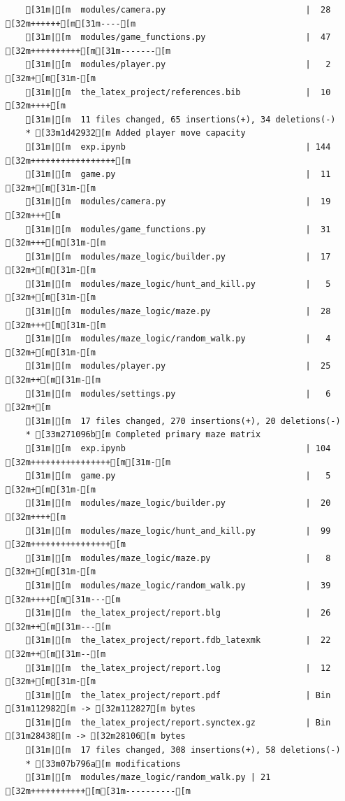 \documentclass{article}
\begin{document}
{\begin{verbatim}
    [31m|[m  modules/camera.py                            |  28 [32m++++++[m[31m----[m
    [31m|[m  modules/game_functions.py                    |  47 [32m++++++++++[m[31m-------[m
    [31m|[m  modules/player.py                            |   2 [32m+[m[31m-[m
    [31m|[m  the_latex_project/references.bib             |  10 [32m++++[m
    [31m|[m  11 files changed, 65 insertions(+), 34 deletions(-)
    * [33m1d42932[m Added player move capacity
    [31m|[m  exp.ipynb                                    | 144 [32m+++++++++++++++++[m
    [31m|[m  game.py                                      |  11 [32m+[m[31m-[m
    [31m|[m  modules/camera.py                            |  19 [32m+++[m
    [31m|[m  modules/game_functions.py                    |  31 [32m+++[m[31m-[m
    [31m|[m  modules/maze_logic/builder.py                |  17 [32m+[m[31m-[m
    [31m|[m  modules/maze_logic/hunt_and_kill.py          |   5 [32m+[m[31m-[m
    [31m|[m  modules/maze_logic/maze.py                   |  28 [32m+++[m[31m-[m
    [31m|[m  modules/maze_logic/random_walk.py            |   4 [32m+[m[31m-[m
    [31m|[m  modules/player.py                            |  25 [32m++[m[31m-[m
    [31m|[m  modules/settings.py                          |   6 [32m+[m
    [31m|[m  17 files changed, 270 insertions(+), 20 deletions(-)
    * [33m271096b[m Completed primary maze matrix
    [31m|[m  exp.ipynb                                    | 104 [32m++++++++++++++++[m[31m-[m
    [31m|[m  game.py                                      |   5 [32m+[m[31m-[m
    [31m|[m  modules/maze_logic/builder.py                |  20 [32m++++[m
    [31m|[m  modules/maze_logic/hunt_and_kill.py          |  99 [32m++++++++++++++++[m
    [31m|[m  modules/maze_logic/maze.py                   |   8 [32m+[m[31m-[m
    [31m|[m  modules/maze_logic/random_walk.py            |  39 [32m++++[m[31m---[m
    [31m|[m  the_latex_project/report.blg                 |  26 [32m++[m[31m---[m
    [31m|[m  the_latex_project/report.fdb_latexmk         |  22 [32m++[m[31m--[m
    [31m|[m  the_latex_project/report.log                 |  12 [32m+[m[31m-[m
    [31m|[m  the_latex_project/report.pdf                 | Bin [31m112982[m -> [32m112827[m bytes
    [31m|[m  the_latex_project/report.synctex.gz          | Bin [31m28438[m -> [32m28106[m bytes
    [31m|[m  17 files changed, 308 insertions(+), 58 deletions(-)
    * [33m07b796a[m modifications
    [31m|[m  modules/maze_logic/random_walk.py | 21 [32m+++++++++++[m[31m----------[m

\end{verbatim}}
\end{document}
